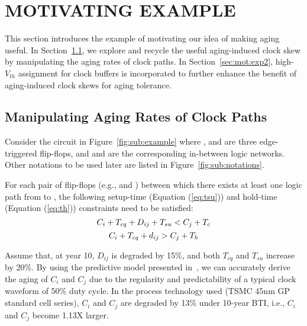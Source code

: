 \section{MOTIVATING EXAMPLE}
\label{sec:motivate}


This section introduces the example of motivating our idea of making aging useful. In Section~\ref{sec:mot:exp1}, we explore and recycle the useful aging-induced clock skew by manipulating the aging rates of clock paths. In Section~\ref{sec:mot:exp2}, high-$V_{th}$ assignment for clock buffers is incorporated to further enhance the benefit of aging-induced clock skews for aging tolerance. 

\subsection{Manipulating Aging Rates of Clock Paths}
\label{sec:mot:exp1}
Consider the circuit in Figure~\ref{fig:sub:example} where ,  and  are three edge-triggered flip-flops, and  and  are the corresponding in-between logic networks. Other notations to be used later are listed in Figure~\ref{fig:sub:notations}.

For each pair of flip-flops (e.g.,  and ) between which there exists at least one logic path from  to , the following setup-time (Equation (\ref{eq:tsu})) and hold-time (Equation (\ref{eq:th})) constraints need to be satisfied:
\begin{equation}
	\fontsize{9}{9.6} C_i+T_{cq}+D_{ij}+T_{su}<C_j+T_c
	\label{eq:tsu}
\end{equation}
\begin{equation}
	\fontsize{9}{9.6} C_i+T_{cq}+d_{ij}>C_j+T_h
	\label{eq:th}
\end{equation}

Assume that, at year 10, $D_{ij}$ is degraded by 15\%, and both $T_{cq}$ and $T_{su}$ increase by 20\%. By using the predictive model presented in~\cite{wang2010impact, wang2007efficient, amrouch2016reliability}, we can accurately derive the aging of $C_i$ and $C_j$ due to the regularity and predictability of a typical clock waveform of 50\% duty cycle. In the process technology used (TSMC 45nm GP standard cell series), $C_i$ and $C_j$ are degraded by 13\% under 10-year BTI, i.e., $C_i$ and $C_j$ become 1.13X larger.

